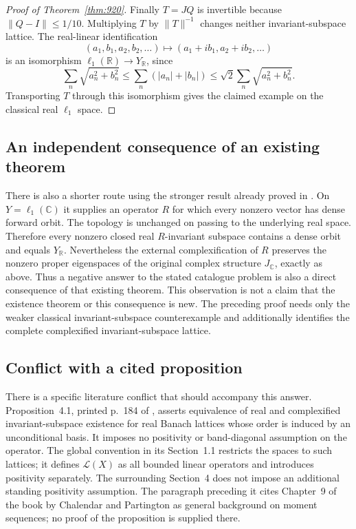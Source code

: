 \documentclass[11pt,a4paper]{article}
\theoremstyle{remark}
\begin{document}
\begin{proof}[Proof of Theorem~\ref{thm:920}]
Finally $T=JQ$ is invertible because $\|Q-I\|\leq1/10$.
Multiplying $T$ by $\|T\|^{-1}$ changes neither invariant-subspace
lattice.  The real-linear identification
\[
 (a_1,b_1,a_2,b_2,\ldots)\longmapsto(a_1+ib_1,a_2+ib_2,\ldots)
\]
is an isomorphism $\ell_1(\mathbb R)\to Y_{\mathbb R}$, since
\[
 \sum_n\sqrt{a_n^2+b_n^2}
 \leq\sum_n(|a_n|+|b_n|)
 \leq\sqrt2\sum_n\sqrt{a_n^2+b_n^2}.
\]
Transporting $T$ through this isomorphism gives the claimed example
on the classical real $\ell_1$ space.
\end{proof}

\subsection*{An independent consequence of an existing theorem}

There is also a shorter route using the stronger result already proved
in \cite[Theorem~1.1]{GR2014}.  On $Y=\ell_1(\mathbb C)$ it supplies
an operator $R$ for which every nonzero vector has dense forward orbit.
The topology is unchanged on passing to the underlying real space.
Therefore every nonzero closed real $R$-invariant subspace contains a
dense orbit and equals $Y_{\mathbb R}$.  Nevertheless the external
complexification of $R$ preserves the nonzero proper eigenspaces of
the original complex structure $J_{\mathbb C}$, exactly as above.
Thus a negative answer to the stated catalogue problem is also a
direct consequence of that existing theorem.  This observation is
not a claim that the existence theorem or this consequence is new.
The preceding proof needs only the weaker classical invariant-subspace
counterexample and additionally identifies the complete complexified
invariant-subspace lattice.

\subsection*{Conflict with a cited proposition}

There is a specific literature conflict that should accompany this
answer.  Proposition~4.1, printed p.~184 of \cite{GGGD2023}, asserts
equivalence of real and complexified invariant-subspace existence for
real Banach lattices whose order is induced by an unconditional basis.
It imposes no positivity or band-diagonal assumption on the operator.
The global convention in its Section~1.1 restricts the spaces to such
lattices; it defines $\mathcal L(X)$ as all bounded linear operators
and introduces positivity separately.  The surrounding Section~4 does
not impose an additional standing positivity assumption.
The paragraph preceding it cites Chapter~9 of the book by Chalendar
and Partington as general background on moment sequences; no proof
of the proposition is supplied there.
\end{document}
